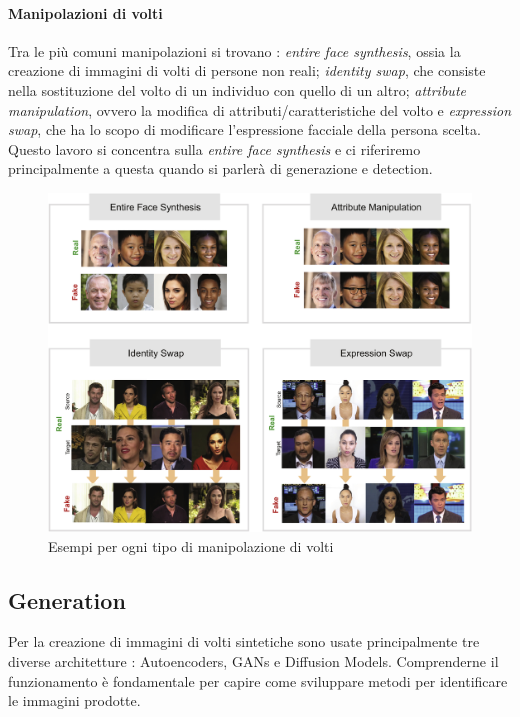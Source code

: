 \paragraph{Manipolazioni di volti} Tra le più comuni manipolazioni si trovano \cite{tolosana2020deepfakes}:
\textit{entire face synthesis}, ossia la creazione di immagini di volti di persone non reali; \textit{identity swap}, che consiste nella sostituzione del volto di un individuo con quello di un altro; \textit{attribute manipulation}, ovvero la modifica di attributi/caratteristiche del volto e \textit{ expression swap}, che ha lo scopo di modificare l'espressione facciale della persona scelta.
Questo lavoro si concentra sulla \textit{entire face synthesis} e ci riferiremo principalmente a questa quando si parlerà di generazione e detection.
\begin{figure}
    \centering
     \includegraphics[width=1\linewidth]{img/face manipulations.jpg}
     \caption{Esempi per ogni tipo di manipolazione di volti}
     \label{fig:facemanip}
\end{figure}
\subsection{Generation}
Per la creazione di immagini di volti sintetiche sono usate principalmente tre diverse architetture \cite{fernando2025face}: Autoencoders, GANs e Diffusion Models. Comprenderne il funzionamento è fondamentale per capire come sviluppare metodi per identificare le immagini prodotte.
